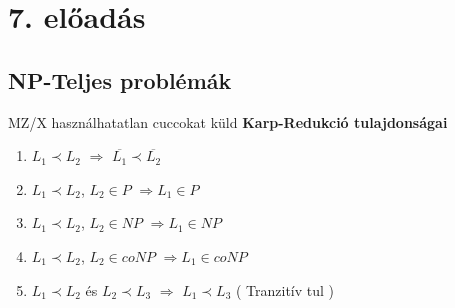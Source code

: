 \section{7. előadás}

\subsection{NP-Teljes problémák}

	\begin{tetel}{MZ/X használhatatlan cuccokat küld}
   \textbf{Karp-Redukció tulajdonságai}
	 \begin{enumerate}[itemsep=1mm]
	 	\item $L_1 \prec L_2$ $\Rightarrow$ $\overline{L_1} \prec \overline{L_2}$
	 	\item $L_1 \prec L_2$, $L_2 \in P$ $\Rightarrow L_1 \in P$
	 	\item $L_1 \prec L_2$, $L_2 \in NP$ $\Rightarrow L_1 \in NP$

	 	\item $L_1 \prec L_2$, $L_2 \in coNP$ $\Rightarrow L_1 \in coNP$

	 	\item $L_1 \prec L_2$ és $L_2 \prec L_3$ $\Rightarrow$ $L_1 \prec L_3$ ( Tranzitív tul )
	 \end{enumerate}
   \end{tetel}

